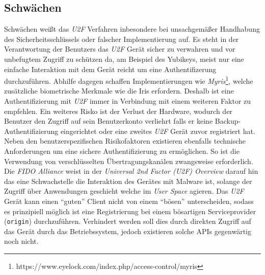 \documentclass[11pt,a4paper,ngerman]{scrreprt}
\begin{document}
\subsection{Schwächen}
Schwächen weißt das \textit{U2F} Verfahren inbesondere bei unsachgemäßer Handhabung des Sicherheitsschlüssels oder falscher Implementierung auf. Es steht in der Verantwortung der Benutzers das \textit{U2F} Gerät sicher zu verwahren und vor unbefugtem Zugriff zu schützen da, am Beispiel des Yubikeys, meist nur eine einfache Interaktion mit dem Gerät reicht um eine Authentifizerung durchzuführen. Abhilfe dagegen schaffen Implementierungen wie \textit{Myris}\footnote{https://www.eyelock.com/index.php/access-control/myris}, welche zusätzliche biometrische Merkmale wie die Iris erfordern. Deshalb ist eine Authentifizierung mit \textit{U2F} immer in Verbindung mit einem weiteren Faktor zu empfehlen. Ein weiteres Risko ist der Verlust der Hardware, wodurch der Benutzer den Zugriff auf sein Benutzerkonto verliehrt falls er keine Backup-Authentifizierung eingerichtet oder eine zweites \textit{U2F} Gerät zuvor registriert hat. Neben den benutzerspezifischen Risikofaktoren existieren ebenfalls technische Anforderungen um eine sichere Authentifizierung zu ermöglichen. So ist die Verwendung von verschlüsselten Übertragungskanälen zwangsweise erforderlich. Die \textit{FIDO Alliance} weist in der \textit{Universal 2nd Factor (U2F) Overview} \cite{u2fSpec} darauf hin das eine Schwachstelle die Interaktion des Gerätes mit Malware ist, solange der Zugriff über Anwendungen geschieht welche im \textit{User Space} agieren. Das \textit{U2F} Gerät kann einen ``guten'' Client nicht von einem ``bösen'' unterscheiden, sodass es prinzipiell möglich ist eine Registrierung bei einem bösartigen Serviceprovider (\texttt{origin}) durchzuführen. Verhindert werden soll dies durch direkten Zugriff auf das Gerät durch das Betriebssystem, jedoch existieren solche APIs gegenwärtig noch nicht.
\end{document}
